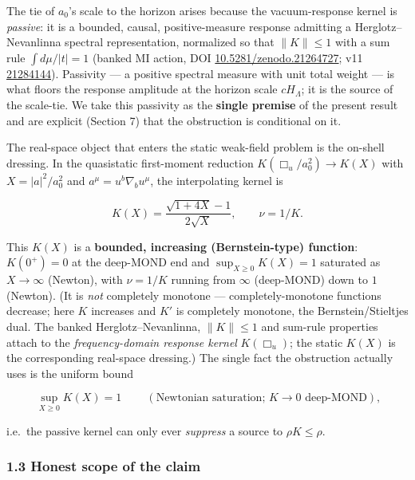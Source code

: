 \documentclass[
]{article}
\begin{document}
The tie of \(a_0\)'s scale to the horizon arises because the
vacuum-response kernel is \emph{passive}: it is a bounded, causal,
positive-measure response admitting a Herglotz--Nevanlinna spectral
representation, normalized so that \(\|K\|\le 1\) with a sum rule
\(\int d\mu/|t| = 1\) (banked MI action, DOI
\href{https://doi.org/10.5281/zenodo.21264727}{10.5281/zenodo.21264727};
v11 \href{https://doi.org/10.5281/zenodo.21284144}{21284144}). Passivity
--- a positive spectral measure with unit total weight --- is what
floors the response amplitude at the horizon scale \(cH_\Lambda\); it is
the source of the scale-tie. We take this passivity as the
\textbf{single premise} of the present result and are explicit (Section
7) that the obstruction is conditional on it.

The real-space object that enters the static weak-field problem is the
on-shell dressing. In the quasistatic first-moment reduction
\(K(\Box_u/a_0^2)\to K(X)\) with \(X=|a|^2/a_0^2\) and
\(a^\mu=u^b\nabla_b u^\mu\), the interpolating kernel is

\[
K(X) = \frac{\sqrt{1+4X}-1}{2\sqrt X}, \qquad \nu = 1/K .
\]

This \(K(X)\) is a \textbf{bounded, increasing (Bernstein-type)
function}: \(K(0^+)=0\) at the deep-MOND end and \(\sup_{X\ge0}K(X)=1\)
saturated as \(X\to\infty\) (Newton), with \(\nu=1/K\) running from
\(\infty\) (deep-MOND) down to \(1\) (Newton). (It is \emph{not}
completely monotone --- completely-monotone functions decrease; here
\(K\) increases and \(K'\) is completely monotone, the
Bernstein/Stieltjes dual. The banked Herglotz--Nevanlinna, \(\|K\|\le1\)
and sum-rule properties attach to the \emph{frequency-domain response
kernel} \(K(\Box_u)\); the static \(K(X)\) is the corresponding
real-space dressing.) The single fact the obstruction actually uses is
the uniform bound

\[
\boxed{\ \sup_{X\ge0} K(X) = 1\ }\qquad(\text{Newtonian saturation; } K\to0\text{ deep-MOND}),
\]

i.e.~the passive kernel can only ever \emph{suppress} a source to
\(\rho K \le \rho\).

\subsubsection{1.3 Honest scope of the
claim}\label{honest-scope-of-the-claim}
\end{document}
